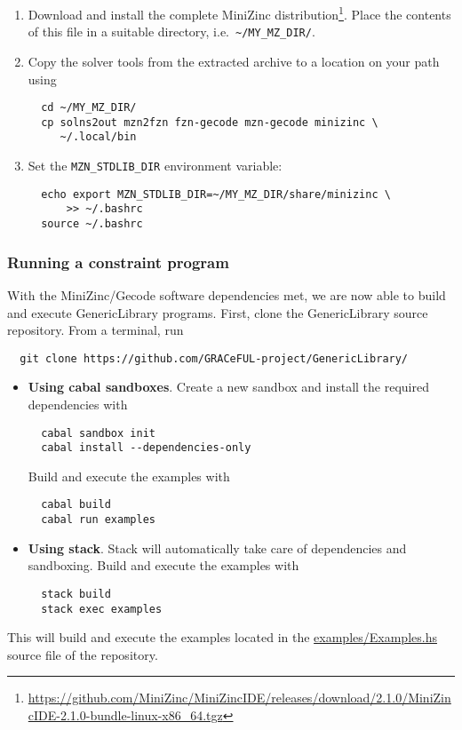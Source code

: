 \begin{enumerate}
\item Download and install the complete MiniZinc
  distribution\footnote{\url{https://github.com/MiniZinc/MiniZincIDE/releases/download/2.1.0/MiniZincIDE-2.1.0-bundle-linux-x86_64.tgz}}.
%
  Place the contents of this file in a suitable directory, i.e.\
  \verb+~/MY_MZ_DIR/+.
\item Copy the solver tools from the extracted archive to a location
  on your path using
%
\begin{verbatim}
  cd ~/MY_MZ_DIR/
  cp solns2out mzn2fzn fzn-gecode mzn-gecode minizinc \
     ~/.local/bin
\end{verbatim}

\item Set the \verb+MZN_STDLIB_DIR+ environment variable:
%
\begin{verbatim}
  echo export MZN_STDLIB_DIR=~/MY_MZ_DIR/share/minizinc \
      >> ~/.bashrc
  source ~/.bashrc
\end{verbatim}
\end{enumerate}


\subsubsection{Running a constraint program}

With the MiniZinc/Gecode software dependencies met, we are now able to
build and execute GenericLibrary programs.
%
First, clone the GenericLibrary source repository.
%
From a terminal, run

\begin{verbatim}
  git clone https://github.com/GRACeFUL-project/GenericLibrary/
\end{verbatim}

\begin{itemize}
\item \textbf{Using cabal sandboxes}.
%
  Create a new sandbox and install the required dependencies with
%
\begin{verbatim}
  cabal sandbox init
  cabal install --dependencies-only
\end{verbatim}

  Build and execute the examples with

\begin{verbatim}
  cabal build
  cabal run examples
\end{verbatim}

\item \textbf{Using stack}.
%
  Stack will automatically take care of dependencies and
  sandboxing.
%
  Build and execute the examples with

\begin{verbatim}
  stack build
  stack exec examples
\end{verbatim}
\end{itemize}

This will build and execute the examples located in the
\href{https://github.com/GRACeFUL-project/GenericLibrary/blob/master/examples/Examples.hs}{examples/Examples.hs}
source file of the repository.
